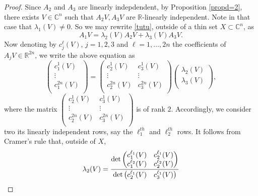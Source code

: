 \documentclass[12pt]{amsart}
\newcommand{\C}{\mathbb C}
\newcommand{\R}{\mathbb R}
\theoremstyle{remark}
\theoremstyle{example}
\theoremstyle{definition}
\numberwithin{equation}{section}
\begin{document}
\begin{proof}
Since $A_2$ and $A_3$ are linearly indepdendent, by   Proposition \ref{propd=2}, there exists $V \in \C^n$ such that $A_2V,A_3V$ are $\R$-linearly independent. Note in that case that $\lambda_1(V) \neq 0$. So we may rewrite \eqref{tutu}, outside of a thin set $X \subset \C^n$, as  
 $$A_1V=\lambda_2(V)A_2V+\lambda_3(V)A_3V.$$
 Now denoting  by $c_j^\ell(V)$, $j=1,2,3$ and $\ell=1,\ldots,2n$ the coefficients of $A_jV \in \R^{2n}$, we write the above equation as 
$$ \begin{pmatrix} 
c_1^1(V) \\ 
\vdots \\ 
c_1^{2n}(V) \\ 
\end{pmatrix} = \begin{pmatrix} 
c_2^1(V) & c_3^1(V)  \\ 
\vdots & \vdots\\ 
c_2^{2n}(V) & c_3^{2n}(V)  \\ 
\end{pmatrix} \begin{pmatrix} 
\lambda_2(V) \\ 
\lambda_3(V) \\ 
\end{pmatrix},$$
where the matrix  $\begin{pmatrix} 
c_2^1(V) & c_3^1(V)  \\ 
\vdots & \vdots\\ 
c_2^{2n}(V) & c_3^{2n}(V)  \\ 
\end{pmatrix}$ is of rank $2.$
Accordingly, we consider two its linearly independent rows, say the 
$\ell_1^{th}$ and $\ell_2^{th}$ rows. It follows from Cramer's rule that, outside of $X$,
$$\lambda_2(V)=\frac{{\rm det}\begin{pmatrix} 
c_1^{\ell_1}(V) & c_2^{\ell_1}(V)\\
c_1^{\ell_2}(V) & c_2^{\ell_2}(V)\\ 
\end{pmatrix}}{{\rm det}\begin{pmatrix} 
c_2^{\ell_1}(V) & c_3^{\ell_1}(V)\\

\end{pmatrix}}$$
\end{proof}
\end{document}
